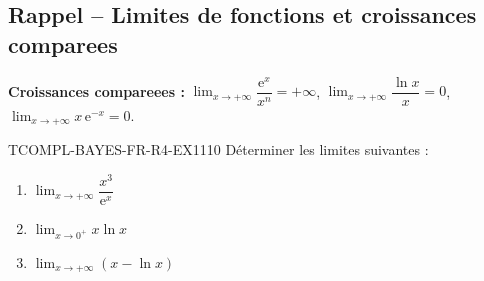 

\subsection*{Rappel -- Limites de fonctions et croissances comparees}

\textbf{Croissances compareees :} $\lim_{x \to +\infty} \dfrac{\mathrm{e}^x}{x^n} = +\infty$, $\lim_{x \to +\infty} \dfrac{\ln x}{x} = 0$, $\lim_{x \to +\infty} x\,\mathrm{e}^{-x} = 0$.

\begin{exercice}{TCOMPL-BAYES-FR-R4-EX1}{1}{10}
Déterminer les limites suivantes :
\begin{enumerate}
  \item $\lim_{x \to +\infty} \dfrac{x^3}{\mathrm{e}^x}$
  \item $\lim_{x \to 0^+} x \ln x$
  \item $\lim_{x \to +\infty} \left(x - \ln x\right)$
\end{enumerate}
\end{exercice}

